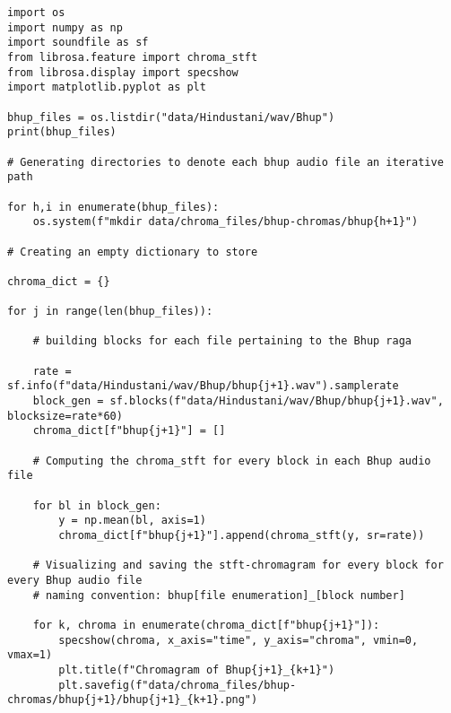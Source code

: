 \begin{lstlisting}
import os
import numpy as np
import soundfile as sf
from librosa.feature import chroma_stft
from librosa.display import specshow
import matplotlib.pyplot as plt

bhup_files = os.listdir("data/Hindustani/wav/Bhup")
print(bhup_files)

# Generating directories to denote each bhup audio file an iterative path

for h,i in enumerate(bhup_files):
    os.system(f"mkdir data/chroma_files/bhup-chromas/bhup{h+1}")

# Creating an empty dictionary to store

chroma_dict = {}

for j in range(len(bhup_files)):

    # building blocks for each file pertaining to the Bhup raga

    rate = sf.info(f"data/Hindustani/wav/Bhup/bhup{j+1}.wav").samplerate
    block_gen = sf.blocks(f"data/Hindustani/wav/Bhup/bhup{j+1}.wav", blocksize=rate*60)
    chroma_dict[f"bhup{j+1}"] = []

    # Computing the chroma_stft for every block in each Bhup audio file

    for bl in block_gen:
        y = np.mean(bl, axis=1)
        chroma_dict[f"bhup{j+1}"].append(chroma_stft(y, sr=rate))

    # Visualizing and saving the stft-chromagram for every block for every Bhup audio file
    # naming convention: bhup[file enumeration]_[block number]

    for k, chroma in enumerate(chroma_dict[f"bhup{j+1}"]):
        specshow(chroma, x_axis="time", y_axis="chroma", vmin=0, vmax=1)
        plt.title(f"Chromagram of Bhup{j+1}_{k+1}")
        plt.savefig(f"data/chroma_files/bhup-chromas/bhup{j+1}/bhup{j+1}_{k+1}.png")
\end{lstlisting}
